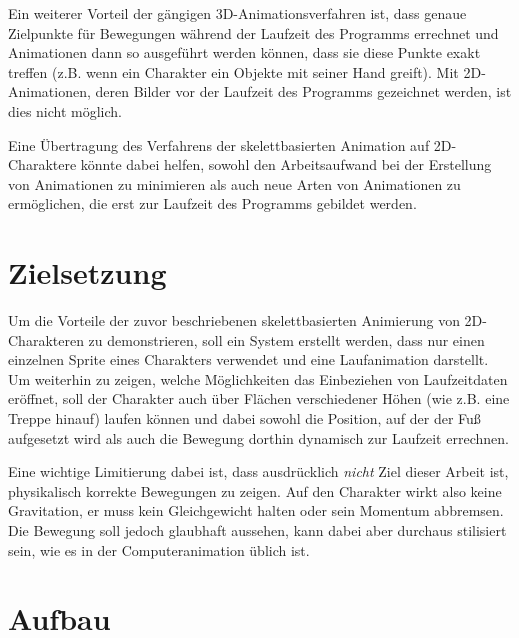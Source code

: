 Ein weiterer Vorteil der gängigen 3D-Animationsverfahren ist, dass genaue Zielpunkte für Bewegungen während der Laufzeit des Programms errechnet und Animationen dann so ausgeführt werden können, dass sie diese Punkte exakt treffen (z.B. wenn ein Charakter ein Objekte mit seiner Hand greift). Mit 2D-Animationen, deren Bilder vor der Laufzeit des Programms gezeichnet werden, ist dies nicht möglich.

Eine Übertragung des Verfahrens der skelettbasierten Animation auf 2D-Charaktere könnte dabei helfen, sowohl den Arbeitsaufwand bei der Erstellung von Animationen zu minimieren als auch neue Arten von Animationen zu ermöglichen, die erst zur Laufzeit des Programms gebildet werden.

\section{Zielsetzung}
Um die Vorteile der zuvor beschriebenen skelettbasierten Animierung von 2D-Charakteren zu demonstrieren, soll ein System erstellt werden, dass nur einen einzelnen Sprite eines Charakters verwendet und eine Laufanimation darstellt. Um weiterhin zu zeigen, welche Möglichkeiten das Einbeziehen von Laufzeitdaten eröffnet, soll der Charakter auch über Flächen verschiedener Höhen (wie z.B. eine Treppe hinauf) laufen können und dabei sowohl die Position, auf der der Fuß aufgesetzt wird als auch die Bewegung dorthin dynamisch zur Laufzeit errechnen.

Eine wichtige Limitierung dabei ist, dass ausdrücklich \textit{nicht} Ziel dieser Arbeit ist, physikalisch korrekte Bewegungen zu zeigen. Auf den Charakter wirkt also keine Gravitation, er muss kein Gleichgewicht halten oder sein Momentum abbremsen. Die Bewegung soll jedoch glaubhaft aussehen, kann dabei aber durchaus stilisiert sein, wie es in der Computeranimation üblich ist.

\section{Aufbau}